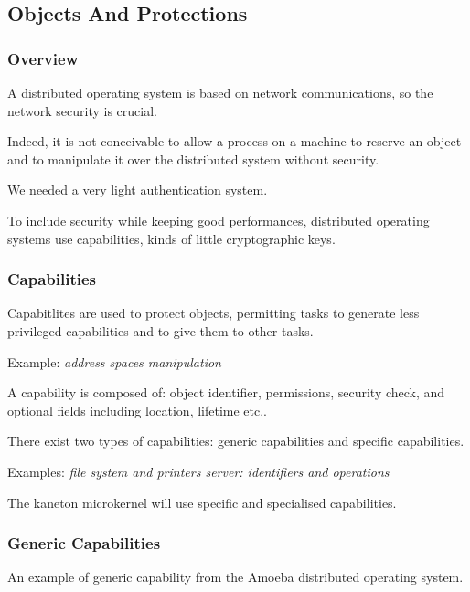 \subsection{Objects And Protections}


\begin{frame}
  \frametitle{Overview}

  A distributed operating system is based on network communications, so
  the network security is crucial.

  \nl

  Indeed, it is not conceivable to allow a process on a machine
  to reserve an object and to manipulate it over the distributed
  system without security.

  \nl

  We needed a very light authentication system.

  \nl

  To include security while keeping good performances, distributed
  operating systems use capabilities, kinds of little cryptographic keys.
\end{frame}


\begin{frame}
  \frametitle{Capabilities}

  Capabitlites are used to protect objects, permitting tasks to generate
  less privileged capabilities and to give them to other tasks.

  \nl

  Example: \textit{address spaces manipulation}

  \nl

  A capability is composed of: object identifier, permissions,
  security check, and optional fields including location, lifetime
  etc..

  \nl

  There exist two types of capabilities: generic capabilities and
  \alert{specific} capabilities.

  \nl

  Examples: \textit{file system and printers server: identifiers
    and operations}

  \nl

  The kaneton microkernel will use specific and specialised capabilities.
\end{frame}


\begin{frame}
  \frametitle{Generic Capabilities}

  An example of generic capability from the Amoeba distributed operating
  system.

  \nl

  \begin{center}
  \end{center}
\end{frame}

